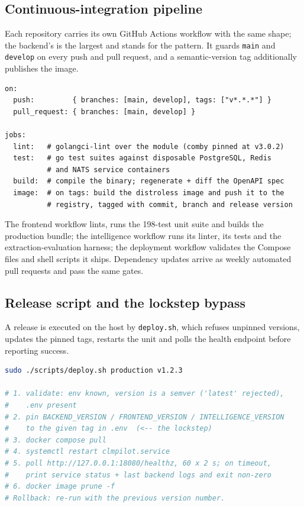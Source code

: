 \subsection{Continuous-integration pipeline}

Each repository carries its own GitHub Actions workflow with the same
shape; the backend's is the largest and stands for the pattern. It
guards \texttt{main} and \texttt{develop} on every push and pull
request, and a semantic-version tag additionally publishes the image.

\begin{lstlisting}[language=yamlcfg]
on:
  push:         { branches: [main, develop], tags: ["v*.*.*"] }
  pull_request: { branches: [main, develop] }

jobs:
  lint:   # golangci-lint over the module (comby pinned at v3.0.2)
  test:   # go test suites against disposable PostgreSQL, Redis
          # and NATS service containers
  build:  # compile the binary; regenerate + diff the OpenAPI spec
  image:  # on tags: build the distroless image and push it to the
          # registry, tagged with commit, branch and release version
\end{lstlisting}

The frontend workflow lints, runs the 198-test unit suite and builds
the production bundle; the intelligence workflow runs its linter, its
tests and the extraction-evaluation harness; the deployment workflow
validates the Compose files and shell scripts it ships. Dependency
updates arrive as weekly automated pull requests and pass the same
gates.

\subsection{Release script and the lockstep bypass}

A release is executed on the host by \texttt{deploy.sh}, which refuses
unpinned versions, updates the pinned tags, restarts the unit and
polls the health endpoint before reporting success.

\begin{lstlisting}[language=bash]
sudo ./scripts/deploy.sh production v1.2.3

# 1. validate: env known, version is a semver ('latest' rejected),
#    .env present
# 2. pin BACKEND_VERSION / FRONTEND_VERSION / INTELLIGENCE_VERSION
#    to the given tag in .env  (<-- the lockstep)
# 3. docker compose pull
# 4. systemctl restart clmpilot.service
# 5. poll http://127.0.0.1:18080/healthz, 60 x 2 s; on timeout,
#    print service status + last backend logs and exit non-zero
# 6. docker image prune -f
# Rollback: re-run with the previous version number.
\end{lstlisting}

